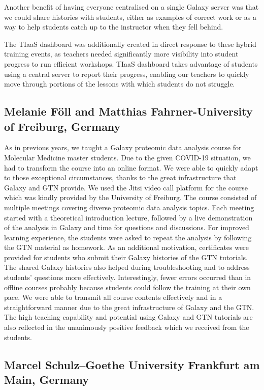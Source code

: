 Another benefit of having everyone centralised on a single Galaxy server was that we could share histories with students, either as examples of correct work or as a way to help students catch up to the instructor when they fell behind.

The TIaaS dashboard was additionally created in direct response to these hybrid training events, as teachers needed significantly more visibility into student progress to run efficient workshops. TIaaS dashboard takes advantage of students using a central server to report their progress, enabling our teachers to quickly move through portions of the lessons with which students do not struggle.

\subsection*{Melanie Föll and Matthias Fahrner-University of Freiburg, Germany}

As in previous years, we taught a Galaxy proteomic data analysis course for Molecular Medicine master students. Due to the given COVID-19 situation, we had to transform the course into an online format. We were able to quickly adapt to those exceptional circumstances, thanks to the great infrastructure that Galaxy and GTN provide. We used the Jitsi video call platform for the course which was kindly provided by the University of Freiburg. The course consisted of multiple meetings covering diverse proteomic data analysis topics. Each meeting started with a theoretical introduction lecture, followed by a live demonstration of the analysis in Galaxy and time for questions and discussions. For improved learning experience, the students were asked to repeat the analysis by following the GTN material as homework. As an additional motivation, certificates were provided for students who submit their Galaxy histories of the GTN tutorials. The shared Galaxy histories also helped during troubleshooting and to address students’ questions more effectively. Interestingly, fewer errors occurred than in offline courses probably because students could follow the training at their own pace. We were able to transmit all course contents effectively and in a straightforward manner due to the great infrastructure of Galaxy and the GTN. The high teaching capability and potential using Galaxy and GTN tutorials are also reflected in the unanimously positive feedback which we received from the students.

\subsection*{Marcel Schulz–Goethe University Frankfurt am Main, Germany}


